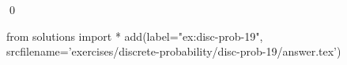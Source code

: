 
\begin{ex} 
  \label{ex:disc-prob-19}
  
  \qed
\end{ex} 
\begin{python0}
from solutions import *
add(label="ex:disc-prob-19",
    srcfilename='exercises/discrete-probability/disc-prob-19/answer.tex') 
\end{python0}
